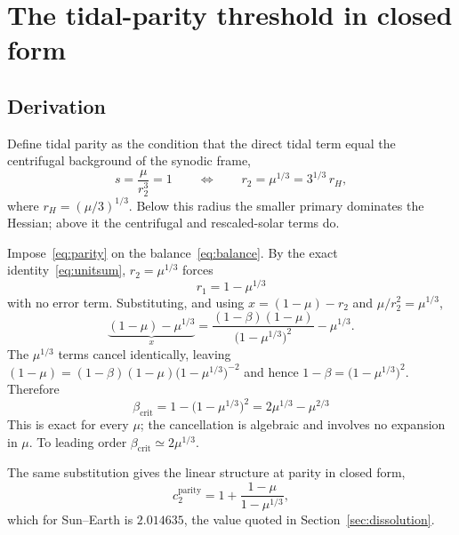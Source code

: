 \documentclass[11pt,a4paper]{article}
\begin{document}
\section{The tidal-parity threshold in closed form}\label{sec:closed}

\subsection{Derivation}

Define tidal parity as the condition that the direct tidal term equal the
centrifugal background of the synodic frame,
\begin{equation}
  s = \frac{\mu}{r_2^{3}} = 1
  \qquad\Longleftrightarrow\qquad
  r_2 = \mu^{1/3} = 3^{1/3}\,r_H ,
  \label{eq:parity}
\end{equation}
where $r_H=(\mu/3)^{1/3}$. Below this radius the smaller primary dominates the
Hessian; above it the centrifugal and rescaled-solar terms do.

Impose~\eqref{eq:parity} on the balance~\eqref{eq:balance}. By the exact
identity~\eqref{eq:unitsum}, $r_2=\mu^{1/3}$ forces
\begin{equation}
  r_1 = 1-\mu^{1/3}
\end{equation}
with no error term. Substituting, and using $x=(1-\mu)-r_2$ and
$\mu/r_2^{2}=\mu^{1/3}$,
\begin{equation}
  \underbrace{(1-\mu)-\mu^{1/3}}_{x}
  = \frac{(1-\beta)(1-\mu)}{\bigl(1-\mu^{1/3}\bigr)^{2}} - \mu^{1/3} .
\end{equation}
The $\mu^{1/3}$ terms cancel identically, leaving
$(1-\mu)=(1-\beta)(1-\mu)\bigl(1-\mu^{1/3}\bigr)^{-2}$ and hence
$1-\beta=\bigl(1-\mu^{1/3}\bigr)^{2}$. Therefore
\begin{equation}
  \boxed{\;
  \beta_{\mathrm{crit}} = 1-\bigl(1-\mu^{1/3}\bigr)^{2}
                        = 2\mu^{1/3}-\mu^{2/3}
  \;}
  \label{eq:closed}
\end{equation}
This is exact for every $\mu$; the cancellation is algebraic and involves no
expansion in $\mu$. To leading order $\beta_{\mathrm{crit}}\simeq2\mu^{1/3}$.

The same substitution gives the linear structure at parity in closed form,
\begin{equation}
  c_2^{\mathrm{parity}} = 1 + \frac{1-\mu}{1-\mu^{1/3}} ,
  \label{eq:Aparity}
\end{equation}
which for Sun--Earth is $2.014635$, the value quoted in
Section~\ref{sec:dissolution}.
\end{document}
